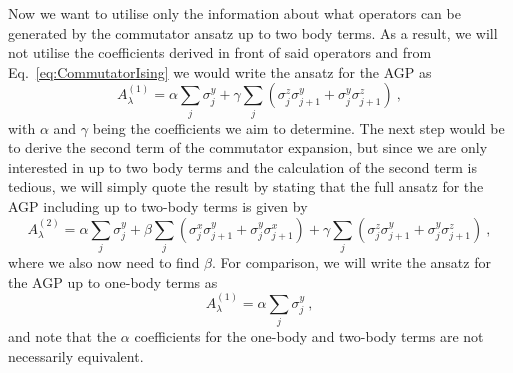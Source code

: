 Now we want to utilise only the information about what operators can be generated by the commutator ansatz up to two body terms. As a result, we will not utilise the coefficients derived in front of said operators and from Eq.~\eqref{eq:CommutatorIsing} we would write the ansatz for the AGP as
\begin{equation}
    A_\lambda^{(1)} = \alpha \sum_j \sigma_j^y + \gamma \sum_j \left( \sigma_j^z \sigma_{j+1}^y + \sigma_j^y \sigma_{j+1}^z  \right) \ ,
\end{equation}
with $\alpha$ and $\gamma$ being the coefficients we aim to determine. The next step would be to derive the second term of the commutator expansion, but since we are only interested in up to two body terms and the calculation of the second term is tedious, we will simply quote the result by stating that the full ansatz for the AGP including up to two-body terms is given by
\begin{equation}
    A_\lambda^{(2)} = \alpha \sum_j \sigma_j^y + \beta \sum_j \left( \sigma_j^x \sigma_{j+1}^y + \sigma_j^y \sigma_{j+1}^x  \right) + \gamma \sum_j \left( \sigma_j^z \sigma_{j+1}^y + \sigma_j^y \sigma_{j+1}^z  \right) \ ,
\end{equation}
where we also now need to find $\beta$. For comparison, we will write the ansatz for the AGP up to one-body terms as
\begin{equation}
    A_\lambda^{(1)} = \alpha \sum_j \sigma_j^y \ ,
\end{equation}
and note that the $\alpha$ coefficients for the one-body and two-body terms are not necessarily equivalent.

